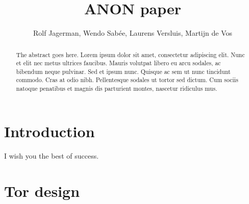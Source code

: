 \documentclass[journal]{IEEEtran}
\begin{document}
	\title{ANON paper}
	\author{Rolf Jagerman, Wendo Sab\'ee, Laurens Versluis, Martijn de Vos}


	\maketitle

	\begin{abstract}
		The abstract goes here. Lorem ipsum dolor sit amet, consectetur adipiscing elit. Nunc et elit nec metus ultrices faucibus. Mauris volutpat libero eu arcu sodales, ac bibendum neque pulvinar. Sed et ipsum nunc. Quisque ac sem ut nunc tincidunt commodo. Cras at odio nibh. Pellentesque sodales ut tortor sed dictum. Cum sociis natoque penatibus et magnis dis parturient montes, nascetur ridiculus mus. 
	\end{abstract}


	\section{Introduction}
		I wish you the best of success.
		
		
	\section{Tor design}
		
\end{document}
